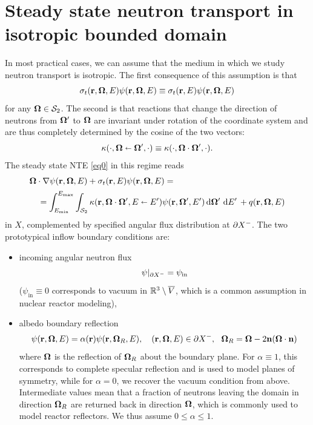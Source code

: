 \section{Steady state neutron transport in isotropic bounded domain}\label{sec:NTE}
In most practical cases, we can assume that the medium in which we study neutron transport is isotropic.
The first consequence of this assumption is that 
$$
	\sigma_t(\br,\bomega,E)\psi(\br,\bomega,E) \equiv \sigma_t(\br,E)\psi(\br,\bomega,E)
$$ 
for any $\bomega\in\Sphere$. The
second is that reactions that change the direction of neutrons from $\bomega'$ to $\bomega$ are
invariant under rotation of the coordinate system and are thus completely determined by the cosine of the two vectors:
\begin{equation}\label{eq:iso}
	\kappa(\cdot,\bomega\sla\bomega',\cdot) \equiv \kappa(\cdot,\bomega\cdot\bomega',\cdot).
\end{equation}
The steady state NTE \eqref{eq0} in this regime reads
\begin{equation}\label{eq1}
\begin{multlined}
  \bomega\cdot\nabla\psi(\br,\bomega,E) + \sigma_t(\br,E)\psi(\br,\bomega,E) =\\[.25em]
   = \intE[']{\Emin}{\Emax}{
      \intA[']{\kappa(\br,\bomega\cdot\bomega',E\sla E')\psi(\br,\bomega',E')}
    } + q(\br,\bomega,E)
 \end{multlined}
\end{equation}
in $X$, complemented by specified angular flux distribution at $\pX[-]$. The two prototypical inflow boundary
conditions are:
\begin{itemize}
	\item incoming angular neutron flux
	\begin{equation}\label{eq:nte2}
	  \psi\vert_{\pX[-]} = \psi_{\text{in}}
	\end{equation}
	($\psi_{\text{in}}\equiv 0$ corresponds to vacuum in $\R[3]\setminus \overline V$, which is a common
	 assumption in nuclear reactor modeling),
	
	\item albedo boundary reflection
	\begin{equation}\label{eq:nte3}
  	\psi(\br,\bomega,E) = \alpha(\br)\psi(\br, \bomega_R, E),\quad (\br,\bomega,E)\in \pX[-],\ \ \bomega_R = \bomega - 2
  	\bn (\bomega \cdot \bn)
  \end{equation}
  where $\bomega$ is the reflection of $\bomega_R$ about the boundary plane. For $\alpha \equiv 1$, this corresponds to
  complete specular reflection and is used to model planes of symmetry, while for $\alpha =
  0$, we recover the vacuum condition from above. Intermediate values mean that a fraction of neutrons leaving the
  domain in direction $\bomega_R$ are returned back in direction $\bomega$, which is commonly used to model reactor
  reflectors. We thus assume $0 \leq \alpha \leq 1$. 
\end{itemize}
